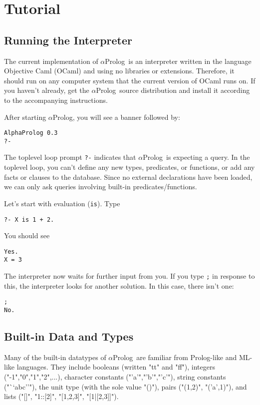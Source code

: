 \documentclass[draft,12pt]{report}
\newcommand{\quot}[1]{``#1''}
\newcommand{\aprolog}{$\alpha${Prolog}\xspace}
\begin{document}
\chapter{Tutorial}

\section{Running the Interpreter}

The current implementation of \aprolog\ is an interpreter written in
the language Objective Caml (OCaml) and using no libraries or extensions.  
Therefore, it should run on any
computer system that the current version of OCaml runs on.  If you 
haven't already, get
the \aprolog\ source distribution and install it according to the
accompanying instructions.

After starting \aprolog, you will see a banner followed by:
\begin{verbatim}
AlphaProlog 0.3
?- 
\end{verbatim}
The toplevel loop prompt {\tt ?-} indicates that \aprolog\ is
expecting a query.  In the toplevel loop, you can't define any new
types, predicates, or functions, or add any facts or clauses to the
database.  Since no external declarations have been loaded, we can
only ask queries involving built-in predicates/functions.

Let's start with evaluation ({\tt is}).  Type
\begin{verbatim}
?- X is 1 + 2.
\end{verbatim}
You should see
\begin{verbatim}
Yes.
X = 3 
\end{verbatim}
The interpreter now waits for further input from you.  If you type
{\tt ;} in response to this, the interpreter looks for another
solution.  In this case, there isn't one:
\begin{verbatim}
;
No.
\end{verbatim}

\section{Built-in Data and Types}

Many of the built-in datatypes of \aprolog\ are familiar from
Prolog-like and ML-like languages.  They include booleans (written
"tt" and "ff"), integers ("-1","0","1","2",...), character constants
("'a'","'b'","'c'"), string constants ("\quot{abc}"), the unit type
(with the sole value "()"), pairs ("(1,2)", "('a',1)"), and lists
("[]", "1::[2]", "[1,2,3]", "[1|[2,3]]").
\end{document}
